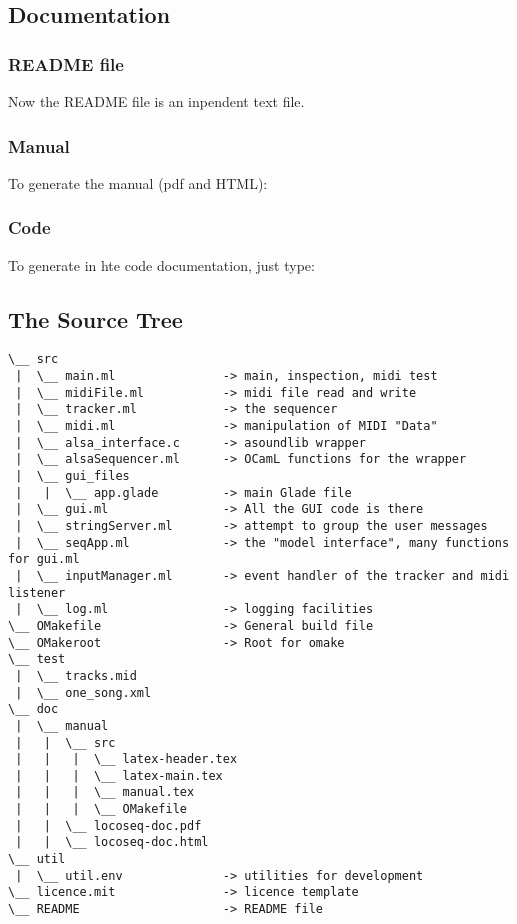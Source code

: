\subsection{Documentation}

\subsubsection{README file}

Now the README file is an inpendent text file.

\subsubsection{Manual}

To generate the manual (pdf and HTML):


\subsubsection{Code}

To generate in  hte code documentation, just type:



\subsection{The Source Tree}

\begin{verbatim}
\__ src                                        
 |  \__ main.ml               -> main, inspection, midi test
 |  \__ midiFile.ml           -> midi file read and write
 |  \__ tracker.ml            -> the sequencer
 |  \__ midi.ml               -> manipulation of MIDI "Data"
 |  \__ alsa_interface.c      -> asoundlib wrapper
 |  \__ alsaSequencer.ml      -> OCamL functions for the wrapper
 |  \__ gui_files                   
 |   |  \__ app.glade         -> main Glade file
 |  \__ gui.ml                -> All the GUI code is there
 |  \__ stringServer.ml       -> attempt to group the user messages
 |  \__ seqApp.ml             -> the "model interface", many functions for gui.ml 
 |  \__ inputManager.ml       -> event handler of the tracker and midi listener
 |  \__ log.ml                -> logging facilities
\__ OMakefile                 -> General build file
\__ OMakeroot                 -> Root for omake
\__ test                                       
 |  \__ tracks.mid  
 |  \__ one_song.xml                             
\__ doc
 |  \__ manual
 |   |  \__ src
 |   |   |  \__ latex-header.tex
 |   |   |  \__ latex-main.tex
 |   |   |  \__ manual.tex
 |   |   |  \__ OMakefile
 |   |  \__ locoseq-doc.pdf
 |   |  \__ locoseq-doc.html
\__ util                      
 |  \__ util.env              -> utilities for development
\__ licence.mit               -> licence template
\__ README                    -> README file
\end{verbatim}


